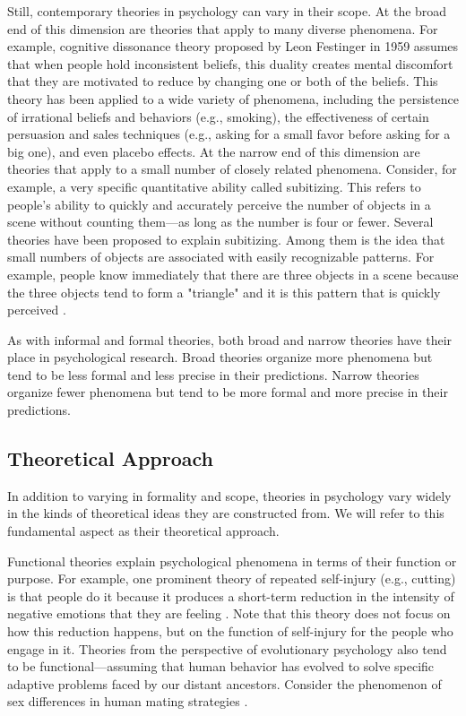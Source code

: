 Still, contemporary theories in psychology can vary in their scope. At the broad end of this dimension are theories that apply to many diverse phenomena. For example, cognitive dissonance theory proposed by Leon Festinger in 1959 assumes that when people hold inconsistent beliefs, this duality creates mental discomfort that they are motivated to reduce by changing one or both of the beliefs. This theory has been applied to a wide variety of phenomena, including the persistence of irrational beliefs and behaviors (e.g., smoking), the effectiveness of certain persuasion and sales techniques (e.g., asking for a small favor before asking for a big one), and even placebo effects. At the narrow end of this dimension are theories that apply to a small number of closely related phenomena. Consider, for example, a very specific quantitative ability called subitizing. This refers to people's ability to quickly and accurately perceive the number of objects in a scene without counting them---as long as the number is four or fewer. Several theories have been proposed to explain subitizing. Among them is the idea that small numbers of objects are associated with easily recognizable patterns. For example, people know immediately that there are three objects in a scene because the three objects tend to form a "triangle" and it is this pattern that is quickly perceived \citep{logan_subitizing_2003}.

As with informal and formal theories, both broad and narrow theories have their place in psychological research. Broad theories organize more phenomena but tend to be less formal and less precise in their predictions. Narrow theories organize fewer phenomena but tend to be more formal and more precise in their predictions.

\subsection{Theoretical Approach}

In addition to varying in formality and scope, theories in psychology vary widely in the kinds of theoretical ideas they are constructed from. We will refer to this fundamental aspect as their theoretical approach.

Functional theories explain psychological phenomena in terms of their function or purpose. For example, one prominent theory of repeated self-injury (e.g., cutting) is that people do it because it produces a short-term reduction in the intensity of negative emotions that they are feeling \citep{huband_understanding_2009}. Note that this theory does not focus on how this reduction happens, but on the function of self-injury for the people who engage in it. Theories from the perspective of evolutionary psychology also tend to be functional---assuming that human behavior has evolved to solve specific adaptive problems faced by our distant ancestors. Consider the phenomenon of sex differences in human mating strategies \citep{buss_sexual_1993}.

